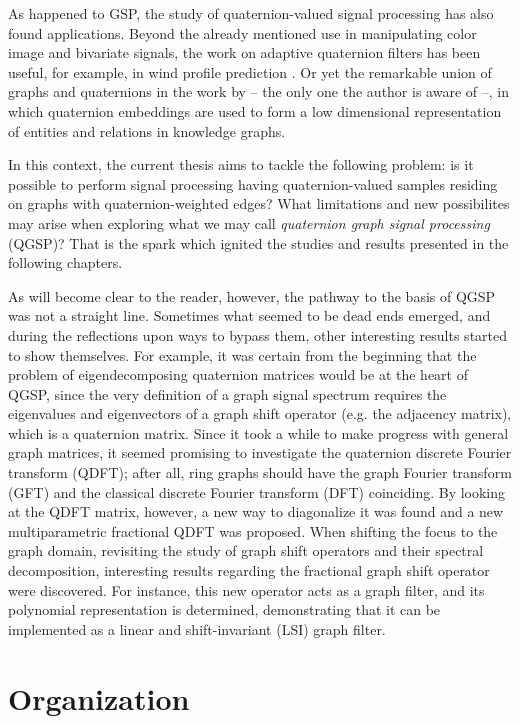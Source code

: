 As happened to GSP, the study of quaternion-valued signal processing has also found applications. Beyond the already mentioned use in manipulating color image and bivariate signals, the work on adaptive quaternion filters has been useful, for example, in wind profile prediction \cite{jiang2014general}. Or yet the remarkable union of graphs and quaternions in the work by \cite{zhang2019quaternion} -- the only one the author is aware of --, in which quaternion embeddings are used to form a low dimensional representation of entities and relations in knowledge graphs.

In this context, the current thesis aims to tackle the following problem: is it possible to perform signal processing having quaternion-valued samples residing on graphs with quaternion-weighted edges? What limitations and new possibilites may arise when exploring what we may call \textit{quaternion graph signal processing} (QGSP)? That is the spark which ignited the studies and results presented in the following chapters.

As will become clear to the reader, however, the pathway to the basis of QGSP was not a straight line. Sometimes what seemed to be dead ends emerged, and during the reflections upon ways to bypass them, other interesting results started to show themselves. For example, it was certain from the beginning that the problem of eigendecomposing quaternion matrices would be at the heart of QGSP, since the very definition of a graph signal spectrum requires the eigenvalues and eigenvectors of a graph shift operator (e.g. the adjacency matrix), which is a quaternion matrix. Since it took a while to make progress with general graph matrices, it seemed promising to investigate the quaternion discrete Fourier transform (QDFT); after all, ring graphs should have the graph Fourier transform (GFT) and the classical discrete Fourier transform (DFT) coinciding. By looking at the QDFT matrix, however, a new way to diagonalize it was found and a new multiparametric fractional QDFT was proposed. When shifting the focus to the graph domain, revisiting the study of graph shift operators and their spectral decomposition, interesting results regarding the fractional graph shift operator were discovered. For instance, this new operator acts as a graph filter, and its polynomial representation is determined, demonstrating that it can be implemented as a linear and shift-invariant (LSI) graph filter.

\section{Organization}

